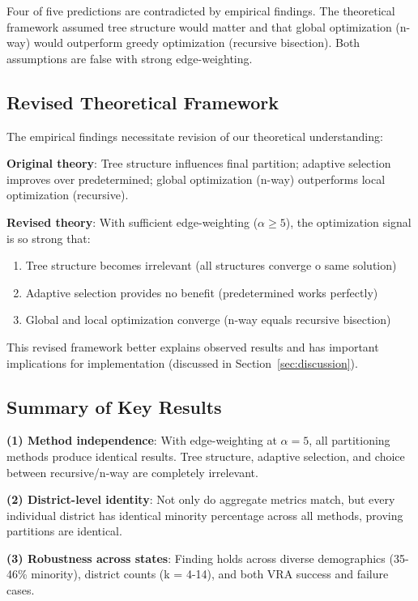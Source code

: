 Four of five predictions are contradicted by empirical findings. The theoretical framework assumed tree structure would matter and that global optimization (n-way) would outperform greedy optimization (recursive bisection). Both assumptions are false with strong edge-weighting.

\subsection{Revised Theoretical Framework}

The empirical findings necessitate revision of our theoretical understanding:

\textbf{Original theory}: Tree structure influences final partition; adaptive selection improves over predetermined; global optimization (n-way) outperforms local optimization (recursive).

\textbf{Revised theory}: With sufficient edge-weighting ($\alpha \geq 5$), the optimization signal is so strong that:
\begin{enumerate}
\item Tree structure becomes irrelevant (all structures converge 	o same solution)
\item Adaptive selection provides no benefit (predetermined works perfectly)
\item Global and local optimization converge (n-way equals recursive bisection)
\end{enumerate}

This revised framework better explains observed results and has important implications for implementation (discussed in Section~\ref{sec:discussion}).

\subsection{Summary of Key Results}

\textbf{(1) Method independence}: With edge-weighting at $\alpha = 5$, all partitioning methods produce identical results. Tree structure, adaptive selection, and choice between recursive/n-way are completely irrelevant.

\textbf{(2) District-level identity}: Not only do aggregate metrics match, but every individual district has identical minority percentage across all methods, proving partitions are identical.

\textbf{(3) Robustness across states}: Finding holds across diverse demographics (35-46\% minority), district counts (k = 4-14), and both VRA success and failure cases.

